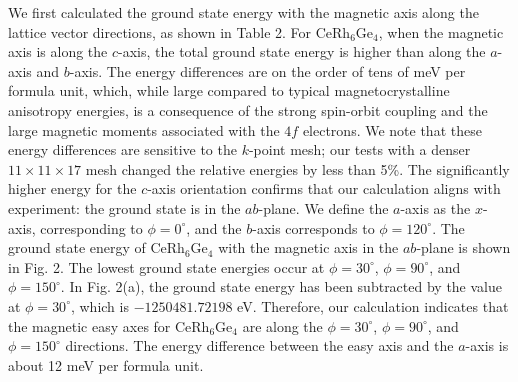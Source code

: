 \documentclass[preprint,12pt]{elsarticle}
\begin{document}
We first calculated the ground state energy with the magnetic axis along the lattice vector directions, as shown in Table 2. For CeRh$_6$Ge$_4$, when the magnetic axis is along the $c$-axis, the total ground state energy is higher than along the $a$-axis and $b$-axis. The energy differences are on the order of tens of meV per formula unit, which, while large compared to typical magnetocrystalline anisotropy energies, is a consequence of the strong spin-orbit coupling and the large magnetic moments associated with the $4f$ electrons. We note that these energy differences are sensitive to the $k$-point mesh; our tests with a denser $11\times11\times17$ mesh changed the relative energies by less than 5\%. The significantly higher energy for the $c$-axis orientation confirms that our calculation aligns with experiment: the ground state is in the $ab$-plane. We define the $a$-axis as the $x$-axis, corresponding to $\phi = 0^\circ$, and the $b$-axis corresponds to $\phi = 120^\circ$. The ground state energy of CeRh$_6$Ge$_4$ with the magnetic axis in the $ab$-plane is shown in Fig. 2. The lowest ground state energies occur at $\phi = 30^\circ$, $\phi = 90^\circ$, and $\phi = 150^\circ$. In Fig. 2(a), the ground state energy has been subtracted by the value at $\phi = 30^\circ$, which is $-1250481.72198$ eV. Therefore, our calculation indicates that the magnetic easy axes for CeRh$_6$Ge$_4$ are along the $\phi = 30^\circ$, $\phi = 90^\circ$, and $\phi = 150^\circ$ directions. The energy difference between the easy axis and the $a$-axis is about 12 meV per formula unit.
\end{document}
